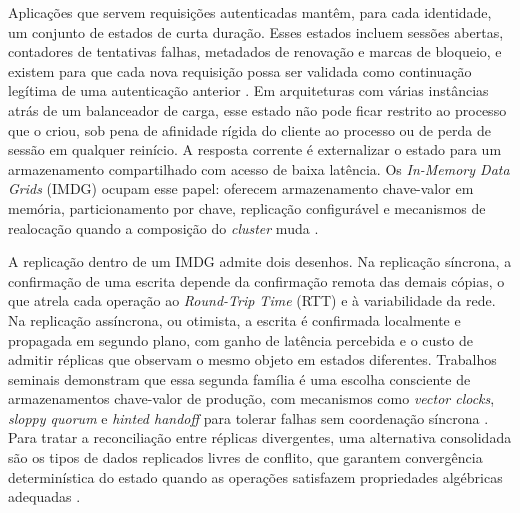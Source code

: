 
\label{sec-contextualizacao}

Aplicações que servem requisições autenticadas mantêm, para cada identidade, um conjunto de estados de curta duração. Esses estados incluem sessões abertas, contadores de tentativas falhas, metadados de renovação e marcas de bloqueio, e existem para que cada nova requisição possa ser validada como continuação legítima de uma autenticação anterior \citep{nist_sp_800_63b4_2025, owasp_session_mgmt_cheatsheet}. Em arquiteturas com várias instâncias atrás de um balanceador de carga, esse estado não pode ficar restrito ao processo que o criou, sob pena de afinidade rígida do cliente ao processo ou de perda de sessão em qualquer reinício. A resposta corrente é externalizar o estado para um armazenamento compartilhado com acesso de baixa latência. Os \emph{In-Memory Data Grids} (IMDG) ocupam esse papel: oferecem armazenamento chave-valor em memória, particionamento por chave, replicação configurável e mecanismos de realocação quando a composição do \emph{cluster} muda \citep{infinispan_intro, infinispan_docs_stable}.

A replicação dentro de um IMDG admite dois desenhos. Na replicação síncrona, a confirmação de uma escrita depende da confirmação remota das demais cópias, o que atrela cada operação ao \emph{Round-Trip Time} (RTT) e à variabilidade da rede. Na replicação assíncrona, ou otimista, a escrita é confirmada localmente e propagada em segundo plano, com ganho de latência percebida e o custo de admitir réplicas que observam o mesmo objeto em estados diferentes. Trabalhos seminais demonstram que essa segunda família é uma escolha consciente de armazenamentos chave-valor de produção, com mecanismos como \emph{vector clocks}, \emph{sloppy quorum} e \emph{hinted handoff} para tolerar falhas sem coordenação síncrona \citep{decandia_dynamo_2007}. Para tratar a reconciliação entre réplicas divergentes, uma alternativa consolidada são os tipos de dados replicados livres de conflito, que garantem convergência determinística do estado quando as operações satisfazem propriedades algébricas adequadas \citep{shapiro_crdt_2011}.

